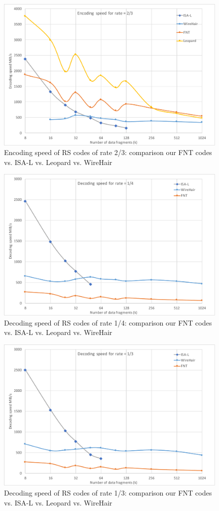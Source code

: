\documentclass[oneside,9pt]{article}
\begin{document}
\begin{figure}[!ht]
\centering
\includegraphics[width=0.7\columnwidth]{Enc_Rate2-3.pdf}
\caption{Encoding speed of RS codes of rate 2/3: comparison our FNT codes vs. ISA-L vs. Leopard vs. WireHair}
\label{fig:comp_enc_rate_2_3}
\end{figure}

\begin{figure}[!ht]
\centering
\includegraphics[width=0.7\columnwidth]{Dec_Rate1-4.pdf}
\caption{Decoding speed of RS codes of rate 1/4: comparison our FNT codes vs. ISA-L vs. Leopard vs. WireHair}
\label{fig:comp_dec_rate_1_4}
\end{figure}

\begin{figure}[!ht]
\centering
\includegraphics[width=0.7\columnwidth]{Dec_Rate1-3.pdf}
\caption{Decoding speed of RS codes of rate 1/3: comparison our FNT codes vs. ISA-L vs. Leopard vs. WireHair}
\label{fig:comp_dec_rate_1_3}
\end{figure}
\end{document}
